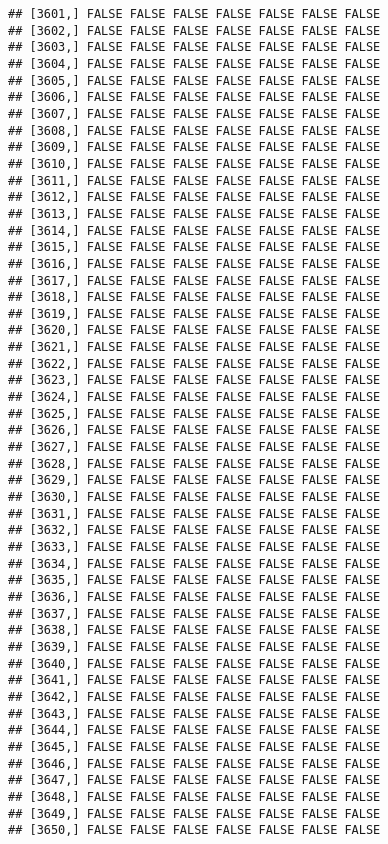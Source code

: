 \documentclass[
]{article}
\begin{document}
\begin{verbatim}
## [3601,] FALSE FALSE FALSE FALSE FALSE FALSE FALSE
## [3602,] FALSE FALSE FALSE FALSE FALSE FALSE FALSE
## [3603,] FALSE FALSE FALSE FALSE FALSE FALSE FALSE
## [3604,] FALSE FALSE FALSE FALSE FALSE FALSE FALSE
## [3605,] FALSE FALSE FALSE FALSE FALSE FALSE FALSE
## [3606,] FALSE FALSE FALSE FALSE FALSE FALSE FALSE
## [3607,] FALSE FALSE FALSE FALSE FALSE FALSE FALSE
## [3608,] FALSE FALSE FALSE FALSE FALSE FALSE FALSE
## [3609,] FALSE FALSE FALSE FALSE FALSE FALSE FALSE
## [3610,] FALSE FALSE FALSE FALSE FALSE FALSE FALSE
## [3611,] FALSE FALSE FALSE FALSE FALSE FALSE FALSE
## [3612,] FALSE FALSE FALSE FALSE FALSE FALSE FALSE
## [3613,] FALSE FALSE FALSE FALSE FALSE FALSE FALSE
## [3614,] FALSE FALSE FALSE FALSE FALSE FALSE FALSE
## [3615,] FALSE FALSE FALSE FALSE FALSE FALSE FALSE
## [3616,] FALSE FALSE FALSE FALSE FALSE FALSE FALSE
## [3617,] FALSE FALSE FALSE FALSE FALSE FALSE FALSE
## [3618,] FALSE FALSE FALSE FALSE FALSE FALSE FALSE
## [3619,] FALSE FALSE FALSE FALSE FALSE FALSE FALSE
## [3620,] FALSE FALSE FALSE FALSE FALSE FALSE FALSE
## [3621,] FALSE FALSE FALSE FALSE FALSE FALSE FALSE
## [3622,] FALSE FALSE FALSE FALSE FALSE FALSE FALSE
## [3623,] FALSE FALSE FALSE FALSE FALSE FALSE FALSE
## [3624,] FALSE FALSE FALSE FALSE FALSE FALSE FALSE
## [3625,] FALSE FALSE FALSE FALSE FALSE FALSE FALSE
## [3626,] FALSE FALSE FALSE FALSE FALSE FALSE FALSE
## [3627,] FALSE FALSE FALSE FALSE FALSE FALSE FALSE
## [3628,] FALSE FALSE FALSE FALSE FALSE FALSE FALSE
## [3629,] FALSE FALSE FALSE FALSE FALSE FALSE FALSE
## [3630,] FALSE FALSE FALSE FALSE FALSE FALSE FALSE
## [3631,] FALSE FALSE FALSE FALSE FALSE FALSE FALSE
## [3632,] FALSE FALSE FALSE FALSE FALSE FALSE FALSE
## [3633,] FALSE FALSE FALSE FALSE FALSE FALSE FALSE
## [3634,] FALSE FALSE FALSE FALSE FALSE FALSE FALSE
## [3635,] FALSE FALSE FALSE FALSE FALSE FALSE FALSE
## [3636,] FALSE FALSE FALSE FALSE FALSE FALSE FALSE
## [3637,] FALSE FALSE FALSE FALSE FALSE FALSE FALSE
## [3638,] FALSE FALSE FALSE FALSE FALSE FALSE FALSE
## [3639,] FALSE FALSE FALSE FALSE FALSE FALSE FALSE
## [3640,] FALSE FALSE FALSE FALSE FALSE FALSE FALSE
## [3641,] FALSE FALSE FALSE FALSE FALSE FALSE FALSE
## [3642,] FALSE FALSE FALSE FALSE FALSE FALSE FALSE
## [3643,] FALSE FALSE FALSE FALSE FALSE FALSE FALSE
## [3644,] FALSE FALSE FALSE FALSE FALSE FALSE FALSE
## [3645,] FALSE FALSE FALSE FALSE FALSE FALSE FALSE
## [3646,] FALSE FALSE FALSE FALSE FALSE FALSE FALSE
## [3647,] FALSE FALSE FALSE FALSE FALSE FALSE FALSE
## [3648,] FALSE FALSE FALSE FALSE FALSE FALSE FALSE
## [3649,] FALSE FALSE FALSE FALSE FALSE FALSE FALSE
## [3650,] FALSE FALSE FALSE FALSE FALSE FALSE FALSE

\end{verbatim}
\end{document}

